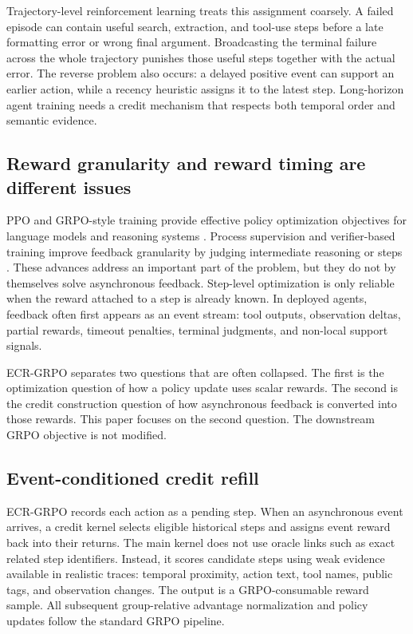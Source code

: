 \documentclass[letterpaper]{article} %
\begin{document}
Trajectory-level reinforcement learning treats this assignment coarsely. A failed episode can contain useful search, extraction, and tool-use steps before a late formatting error or wrong final argument. Broadcasting the terminal failure across the whole trajectory punishes those useful steps together with the actual error. The reverse problem also occurs: a delayed positive event can support an earlier action, while a recency heuristic assigns it to the latest step. Long-horizon agent training needs a credit mechanism that respects both temporal order and semantic evidence.

\subsection{Reward granularity and reward timing are different issues}

PPO and GRPO-style training provide effective policy optimization objectives for language models and reasoning systems \citep{schulman2017ppo,shao2024deepseekmath,deepseekai2025deepseekr1,zhou2026demystifyinggrpo}. Process supervision and verifier-based training improve feedback granularity by judging intermediate reasoning or steps \citep{cobbe2021verifiers,lightman2023verify}. These advances address an important part of the problem, but they do not by themselves solve asynchronous feedback. Step-level optimization is only reliable when the reward attached to a step is already known. In deployed agents, feedback often first appears as an event stream: tool outputs, observation deltas, partial rewards, timeout penalties, terminal judgments, and non-local support signals.

ECR-GRPO separates two questions that are often collapsed. The first is the optimization question of how a policy update uses scalar rewards. The second is the credit construction question of how asynchronous feedback is converted into those rewards. This paper focuses on the second question. The downstream GRPO objective is not modified.

\subsection{Event-conditioned credit refill}

ECR-GRPO records each action as a pending step. When an asynchronous event arrives, a credit kernel selects eligible historical steps and assigns event reward back into their returns. The main kernel does not use oracle links such as exact related step identifiers. Instead, it scores candidate steps using weak evidence available in realistic traces: temporal proximity, action text, tool names, public tags, and observation changes. The output is a GRPO-consumable reward sample. All subsequent group-relative advantage normalization and policy updates follow the standard GRPO pipeline.
\end{document}
